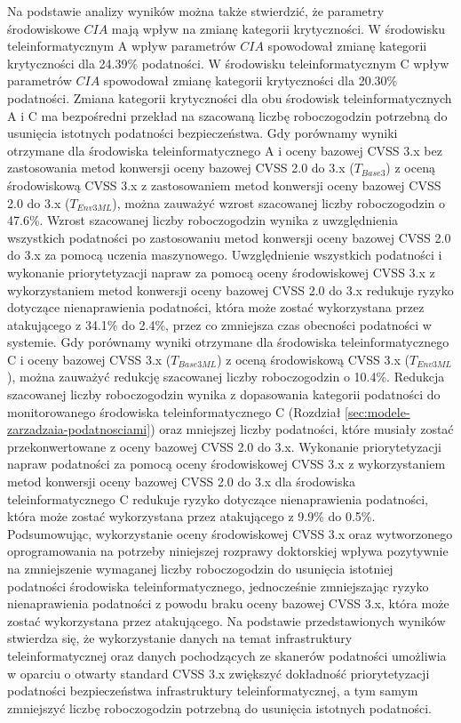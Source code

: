 Na podstawie analizy wyników można także stwierdzić, że parametry środowiskowe $CIA$ mają wpływ na zmianę kategorii krytyczności. W środowisku teleinformatycznym A wpływ parametrów $CIA$ spowodował zmianę kategorii krytyczności dla 24.39\% podatności. W środowisku teleinformatycznym C wpływ parametrów $CIA$ spowodował zmianę kategorii krytyczności dla 20.30\% podatności. Zmiana kategorii krytyczności dla obu środowisk teleinformatycznych A i C ma bezpośredni przekład na szacowaną liczbę roboczogodzin potrzebną do usunięcia istotnych podatności bezpieczeństwa. Gdy porównamy wyniki otrzymane dla środowiska teleinformatycznego A i oceny bazowej CVSS 3.x bez zastosowania metod konwersji oceny bazowej CVSS 2.0 do 3.x ($T_{Base3}$) z oceną środowiskową CVSS 3.x z zastosowaniem metod konwersji oceny bazowej CVSS 2.0 do 3.x ($T_{Env3ML}$), można zauważyć wzrost szacowanej liczby roboczogodzin o 47.6\%. Wzrost szacowanej liczby roboczogodzin wynika z uwzględnienia wszystkich podatności po zastosowaniu metod konwersji oceny bazowej CVSS 2.0 do 3.x za pomocą uczenia maszynowego. Uwzględnienie wszystkich podatności i wykonanie priorytetyzacji napraw za pomocą oceny środowiskowej CVSS 3.x z wykorzystaniem metod konwersji oceny bazowej CVSS 2.0 do 3.x redukuje ryzyko dotyczące nienaprawienia podatności, która może zostać wykorzystana przez atakującego z 34.1\% do 2.4\%, przez co zmniejsza czas obecności podatności w systemie. Gdy porównamy wyniki otrzymane dla środowiska teleinformatycznego C i oceny bazowej CVSS 3.x ($T_{Base3ML}$) z oceną środowiskową CVSS 3.x ($T_{Env3ML}$), można zauważyć redukcję szacowanej liczby roboczogodzin o 10.4\%. Redukcja szacowanej liczby roboczogodzin wynika z dopasowania kategorii podatności do monitorowanego środowiska teleinformatycznego C (Rozdział \ref{sec:modele-zarzadzaia-podatnosciami}) oraz mniejszej liczby podatności, które musiały zostać przekonwertowane z oceny bazowej CVSS 2.0 do 3.x. Wykonanie priorytetyzacji napraw podatności za pomocą oceny środowiskowej CVSS 3.x z wykorzystaniem metod konwersji oceny bazowej CVSS 2.0 do 3.x dla środowiska teleinformatycznego C redukuje ryzyko dotyczące nienaprawienia podatności, która może zostać wykorzystana przez atakującego z 9.9\% do 0.5\%. Podsumowując, wykorzystanie oceny środowiskowej CVSS 3.x oraz wytworzonego oprogramowania na potrzeby niniejszej rozprawy doktorskiej wpływa pozytywnie na zmniejszenie wymaganej liczby roboczogodzin do usunięcia istotniej podatności środowiska teleinformatycznego, jednocześnie zmniejszając ryzyko nienaprawienia podatności z powodu braku oceny bazowej CVSS 3.x, która może zostać wykorzystana przez atakującego. Na podstawie przedstawionych wyników stwierdza się, że wykorzystanie danych na temat infrastruktury teleinformatycznej oraz danych pochodzących ze skanerów podatności umożliwia w oparciu o otwarty standard CVSS 3.x zwiększyć dokładność priorytetyzacji podatności bezpieczeństwa infrastruktury teleinformatycznej, a tym samym zmniejszyć liczbę roboczogodzin potrzebną do usunięcia istotnych podatności.

